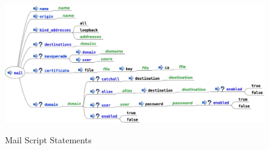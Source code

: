 \begin{figure}[htp]
\includegraphics[width=\maxwidth{1.0\textwidth}]{mail_service_script}
\label{fig:mail_script_statements}
\caption{Mail Script Statements}
\end{figure}

